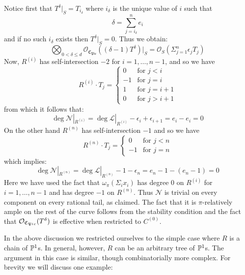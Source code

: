 Notice first that $T^\delta|_S = T_{i_\delta}$ where $i_\delta$ is the unique value of $i$ such that
\begin{equation*} \delta = \sum_{j=i_{\delta}}^n e_i \end{equation*}
and if no such $i_\delta$ exists then $T^\delta|_S = 0$. Thus we obtain:
\begin{equation*} \bigotimes_{0<\delta\leq d}\mathcal{O}_{\mathfrak{C}_{\mathfrak{Pic}}}((\delta-1) T^\delta)|_S = \mathcal{O}_S(\Sigma_{j=1}^n \epsilon_j T_j) \end{equation*}
Now, $R^{(i)}$ has self-intersection $-2$ for $i=1,\ldots,n-1$, and so we have
\begin{equation*}
R^{(i)}\cdot T_j =
  \begin{cases}
    0 & \text{for } j<i \\
    -1 & \text{for } j=i \\
    1 & \text{for } j=i+1 \\
    0 & \text{for } j>i+1
  \end{cases}
\end{equation*}
from which it follows that:
\begin{equation*} \deg \mathcal{N}|_{R^{(i)}} = \deg \mathcal{L}|_{R^{(i)}} - \epsilon_i + \epsilon_{i+1} = e_i - e_i = 0 \end{equation*}
On the other hand $R^{(n)}$ has self-intersection $-1$ and so we have
\begin{equation*}
R^{(n)} \cdot T_j =
\begin{cases}
0 & \text{for } j < n \\
-1 & \text{for } j = n
\end{cases}
\end{equation*}
which implies:
\begin{equation*} \deg \mathcal{N}|_{R^{(n)}} = \deg \mathcal{L}|_{R^{(n)}} - 1 - \epsilon_n = e_n - 1 - (e_n-1) = 0\end{equation*}
Here we have used the fact that $\omega_\pi(\Sigma_i x_i)$ has degree $0$ on $R^{(i)}$ for $i=1,\ldots,n-1$ and has degree $-1$ on $R^{(n)}$. Thus $\mathcal{N}$ is trivial on every component on every rational tail, as claimed. The fact that it is $\pi$-relatively ample on the rest of the curve follows from the stability condition and the fact that $\mathcal{O}_{\mathfrak{C}_{\mathfrak{Pic}}}(T^\delta)$ is effective when restricted to $C^{(0)}$.

In the above discussion we restricted ourselves to the simple case where $R$ is a chain of $\mathbb P^1$s. In general, however, $R$ can be an arbitrary tree of $\mathbb P^1$s. The argument in this case is similar, though combinatorially more complex. For brevity we will discuss one example:

